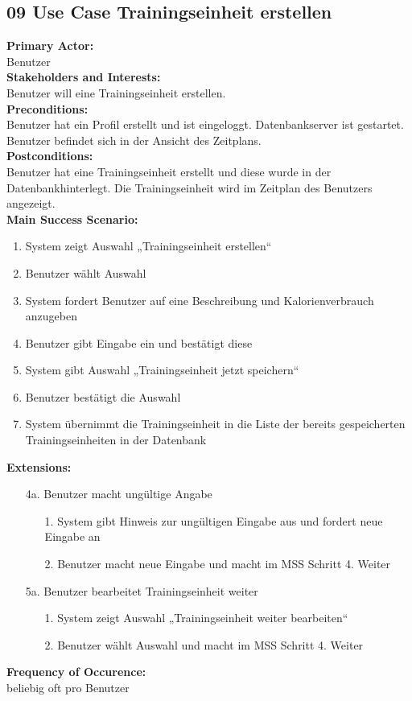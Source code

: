 \documentclass[12pt,a4paper,onecolumn]{article}
\begin{document}
\subsection{09 Use Case  Trainingseinheit erstellen}
\textbf{Primary Actor:}\\ Benutzer\\
\textbf{Stakeholders and Interests:}\\
Benutzer will eine \gls{Trainingseinheit} erstellen.\\
\textbf{Preconditions:} \\ Benutzer hat ein Profil erstellt und ist eingeloggt. 
Datenbankserver ist gestartet. Benutzer befindet sich in der Ansicht des Zeitplans.\\
\textbf{Postconditions:}\\Benutzer hat eine \gls{Trainingseinheit} erstellt und diese wurde in der Datenbankhinterlegt. Die Trainingseinheit wird im Zeitplan des Benutzers angezeigt.\\
\textbf{Main Success Scenario:}
\begin{enumerate}
    \item System zeigt Auswahl „\gls{Trainingseinheit} erstellen“
    \item Benutzer wählt Auswahl
    \item System fordert Benutzer auf eine Beschreibung und Kalorienverbrauch anzugeben
    \item Benutzer gibt Eingabe ein und bestätigt diese
    \item System gibt Auswahl „\gls{Trainingseinheit} jetzt speichern“
    \item Benutzer bestätigt die Auswahl
    \item System übernimmt die \gls{Trainingseinheit} in die Liste der bereits gespeicherten \gls{Trainingseinheit}en in der Datenbank
\end{enumerate}
\textbf{Extensions:}
\begin{enumerate}
    \item [4a.]   Benutzer macht ungültige Angabe
    \begin{enumerate}
        \item[1.]System gibt Hinweis zur ungültigen Eingabe aus und fordert neue Eingabe an
        \item[2.]Benutzer macht neue Eingabe und macht im MSS Schritt 4. Weiter
    \end{enumerate}
    \item [5a.]Benutzer bearbeitet \gls{Trainingseinheit} weiter
    \begin{enumerate}
        \item[1.]System zeigt Auswahl „\gls{Trainingseinheit} weiter bearbeiten“
        \item[2.]Benutzer wählt Auswahl und macht im MSS Schritt 4. Weiter
    \end{enumerate}
\end{enumerate}
\textbf{Frequency of Occurence:}\\beliebig oft pro Benutzer  \\
\end{document}

